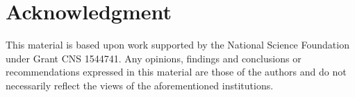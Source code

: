 \documentclass[journal]{IEEEtran}
\begin{document}
\section*{Acknowledgment}
This material is based upon work supported by the National Science Foundation under Grant CNS 1544741. Any opinions, findings and conclusions or
recommendations expressed in this material are those of the authors and do
not necessarily reflect the views of the aforementioned institutions.








\balance


\end{document}
